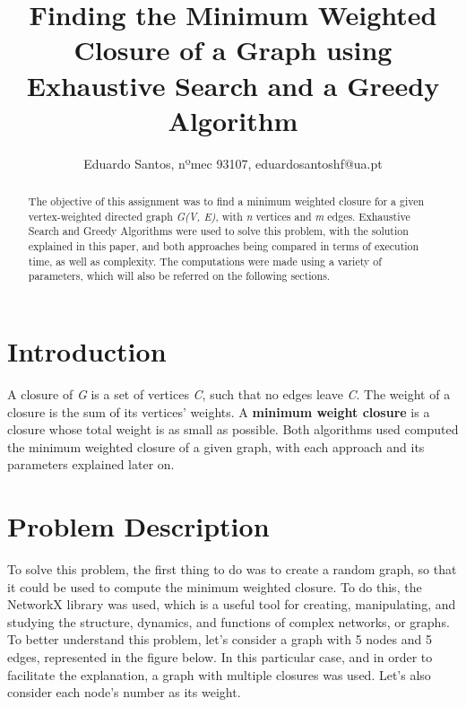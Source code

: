 \documentclass[...]{revdetua}
\begin{document}

\title{Finding the Minimum Weighted Closure of a Graph using Exhaustive Search and a Greedy Algorithm}
\author{Eduardo Santos, nºmec 93107, eduardosantoshf@ua.pt} %
\maketitle

\begin{abstract}
The objective of this assignment was to find a minimum weighted closure for a given vertex-weighted directed graph \textit{G(V, E)}, with \textit{n} vertices and \textit{m} edges. Exhaustive Search and Greedy Algorithms were used to solve this problem, with the solution explained in this paper, and both approaches being compared in terms of execution time, as well as complexity. The computations were made using a variety of parameters, which will also be referred on the following sections.
\end{abstract}

\section{Introduction}

A closure of \textit{G} is a set of vertices \textit{C}, such that no edges leave \textit{C}. The weight of a closure is the sum of its vertices’ weights. A \textbf{minimum weight closure} is a closure whose total weight is as small as possible. Both algorithms used computed the minimum weighted closure of a given graph, with each approach and its parameters explained later on.

\section{ Problem Description}

To solve this problem, the first thing to do was to create a random graph, so that it could be used to compute the minimum weighted closure. To do this, the NetworkX\cite{networkx} library was used, which is a useful tool for creating, manipulating, and studying the structure, dynamics, and functions of complex networks, or graphs.
To better understand this problem, let's consider a graph with 5 nodes and 5 edges, represented in the figure below. In this particular case, and in order to facilitate the explanation, a graph with multiple closures was used. Let's also consider each node's number as its weight. 
\end{document}

